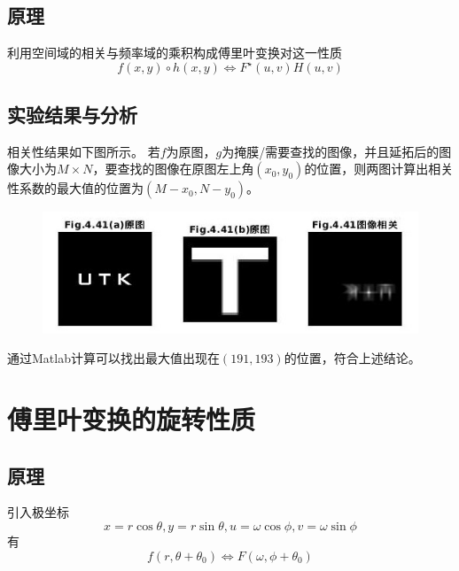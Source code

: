 \documentclass[logo,reportComp]{thesis}
\begin{document}
\subsection{原理}
利用空间域的相关与频率域的乘积构成傅里叶变换对这一性质
\[f(x,y)\circ h(x,y)\iff F^\star(u,v)H(u,v)\]

\subsection{实验结果与分析}
相关性结果如下图所示。
若$f$为原图，$g$为掩膜/需要查找的图像，并且延拓后的图像大小为$M\times N$，要查找的图像在原图左上角$(x_0,y_0)$的位置，则两图计算出相关性系数的最大值的位置为$(M-x_0,N-y_0)$。
\begin{figure}[H]
\centering
\includegraphics[width=\linewidth]{fig/05.jpg}
\end{figure}

通过Matlab计算可以找出最大值出现在$(191,193)$的位置，符合上述结论。

\section{傅里叶变换的旋转性质}
\subsection{原理}
引入极坐标
\[x=r\cos\theta,y=r\sin\theta,u=\omega\cos\phi,v=\omega\sin\phi\]
有
\[f(r,\theta+\theta_0)\iff F(\omega,\phi+\theta_0)\]
\end{document}
